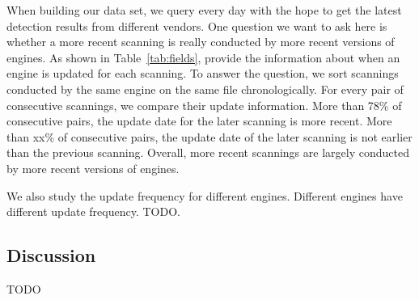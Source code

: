 When building our data set, 
we query \vt{} every day with the 
hope to get the latest detection results from different vendors. 
One question we want to ask here is whether a more recent scanning 
is really conducted by more recent versions of engines. 
As shown in Table~\ref{tab:fields},
\vt{} provide the information about when 
an engine is updated for each scanning.  
To answer the question, we sort scannings conducted by the same engine 
on the same file chronologically.
For every pair of consecutive scannings, we compare their update information. 
More than 78\% of consecutive pairs, the update date for the later scanning is more recent.
More than {\color{red} xx\%} of consecutive pairs, the update date of the later 
scanning is not earlier than the previous scanning. 
Overall, more recent scannings are largely conducted
by more recent versions of engines. 

We also study the update frequency for different engines. 
Different engines have different update frequency. 
{\color{red} TODO}. 

\subsection{Discussion}

{\color{red} TODO}